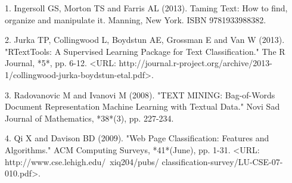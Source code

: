  1. Ingersoll GS, Morton TS and Farris AL (2013). Taming Text: How to find, organize and manipulate it. Manning, New York. ISBN 9781933988382.

2. Jurka TP, Collingwood L, Boydstun AE, Grossman E and Van W (2013). "RTextTools: A Supervised Learning Package for Text Classification." The R Journal, *5*, pp. 6-12. <URL: http://journal.r-project.org/archive/2013-1/collingwood-jurka-boydstun-etal.pdf>.

3. Radovanovic M and Ivanovi M (2008). "TEXT MINING: Bag-of-Words Document Representation Machine Learning with Textual Data." Novi Sad Journal of Mathematics, *38*(3), pp. 227-234.

4. Qi X and Davison BD (2009). "Web Page Classification: Features and Algorithms."  ACM Computing Surveys, *41*(June), pp. 1-31. <URL: http://www.cse.lehigh.edu/~xiq204/pubs/ classification-survey/LU-CSE-07-010.pdf>.



%

%
